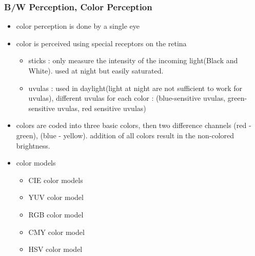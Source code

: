 \documentclass{standalone}
\begin{document}
\subsubsection{B/W Perception, Color Perception}
\begin{itemize}
\item color perception is done by a single eye
\item color is perceived using special receptors on the retina
	\begin{itemize}
		\item sticks : only measure the intensity of the incoming light(Black and White). used at night but easily saturated.
		\item uvulas : used in daylight(light at night are not sufficient to work for uvulas), different uvulas for each color : (blue-sensitive uvulas, green-sensitive uvulas, red sensitive uvulas)
	\end{itemize}
	\item colors are coded into three basic colors, then two difference channels (red - green), (blue - yellow). addition of all colors result in the non-colored brightness.
	\item color models
	\begin{itemize}
		\item CIE color models
		\item YUV color model		
		\item RGB color model
		\item CMY color model
		\item HSV color model
	\end{itemize}
\end{itemize}
\end{document}
